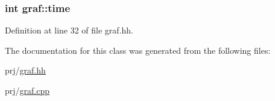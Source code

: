\hypertarget{classgraf_a9202cb6ab351f5bbdbb79de440ab1fb5}{
\subsubsection[{time}]{\setlength{\rightskip}{0pt plus 5cm}int {\bf graf\-::time}}}\label{classgraf_a9202cb6ab351f5bbdbb79de440ab1fb5}


\-Definition at line 32 of file graf.\-hh.



\-The documentation for this class was generated from the following files\-:\begin{DoxyCompactItemize}
\item 
prj/\hyperlink{graf_8hh}{graf.\-hh}\item 
prj/\hyperlink{graf_8cpp}{graf.\-cpp}\end{DoxyCompactItemize}
